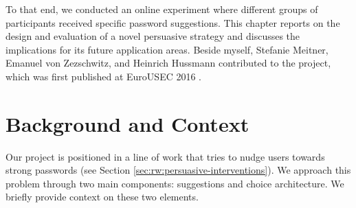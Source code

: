 To that end, we conducted an online experiment where different groups of participants received specific password suggestions. This chapter reports on the design and evaluation of a novel persuasive strategy and discusses the implications for its future application areas. Beside myself, Stefanie Meitner, Emanuel von Zezschwitz, and Heinrich Hussmann contributed to the project, which was first published at EuroUSEC 2016 \cite{Seitz2016SuggestionsDecoy}.



\section{Background and Context}
Our project is positioned in a line of work that tries to nudge users towards strong passwords (see Section \ref{sec:rw:persuasive-interventions}). We approach this problem through two main components: suggestions and choice architecture. We briefly provide context on these two elements.  



